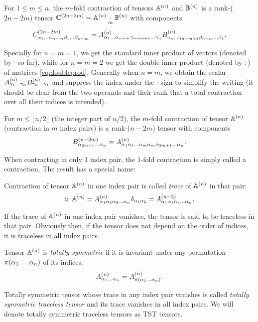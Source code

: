 \begin{definition}\label{def:contraction}
  For $1\leq m \leq n$, the $m$-fold contraction of tensors $\AA$ and $\BB$ is a rank-($2n-2m$) tensor 
  $\CC[2n-2m] = \AA\underset{m}{\cdot}\BB$ with components
  $$
    \CCC[2n-2m]{\alpha_{1}\ldots\alpha_{n-m}\beta_1\ldots\beta_{n-m}} = 
    \AAA{\alpha_1\ldots\alpha_{n-m}\gamma_{n-m+1}\ldots\gamma_n}\BBB{\gamma_n\ldots\gamma_{n-m+1}\beta_{n-m}\ldots\beta_1}.
  $$
\end{definition}
Specially for $n = m = 1$, we get the standard inner product of vectors (denoted by $\cdot$ so far), while for
$n = m = 2$ we get the double inner product (denoted by $:$) of matrices \eqref{eq:doubleprod}. Generally when $n = m$,
we obtain the scalar $\AAA{\gamma_1\ldots\gamma_n}\BBB{\gamma_n\ldots\gamma_1}$ and suppress the index under the $\cdot$ sign to simplify the writing (it should be clear from the two operands and their 
rank that a total contraction over all their indices is intended).

\begin{definition}
  For $m \leq \lfloor n/2 \rfloor$ (the integer part of $n/2$), the $m$-fold contraction of tensor $\AA$ (contraction 
  in $m$ index pairs) is a rank-($n-2m$) tensor with components
  $$
    \BBB[n-2m]{\alpha_{2m+1}\ldots\alpha_n} = \AAA{\alpha_1\alpha_1\ldots\alpha_m\alpha_m\alpha_{2m+1}\ldots\alpha_n}.
  $$
\end{definition}
When contracting in only 1 index pair, the $1$-fold contraction is simply called a contraction. The result has a special 
name:
\begin{definition}\label{def:trace}
  Contraction of tensor $\AA$ in one index pair is called \textit{trace} of $\AA$ in that pair:
  $$
    \trace \AA = \AAA[n]{\alpha_1\alpha_2\alpha_3\ldots\alpha_n}\kron{\alpha_1}{\alpha_2} =
    \AAA[n-2]{\alpha_1\alpha_1\alpha_3\ldots\alpha_n}.
  $$ 
\end{definition}
If the trace of $\AA$ in one index pair vanishes, the tensor is said to be traceless in that pair. Obviously then, if 
the tensor does not depend on the order of indices, it is traceless in all index pairs.
\begin{definition}
  Tensor $\AA$ is \textit{totally symmetric} if it is invariant under any permutation $\perm{\alpha_1\ldots\alpha_n}$ 
  of its indices:
  $$
    \AAA{\alpha_1\ldots\alpha_n} = \AAA{\perm{\alpha_1\ldots\alpha_n}}.
  $$
\end{definition}

\begin{definition}
  Totally symmetric tensor whose trace in any index pair vanishes is called \textit{totally symmetric traceless tensor} 
  and its trace vanishes in all index pairs. We will denote totally symmetric traceless tensors as TST tensors.
\end{definition}

